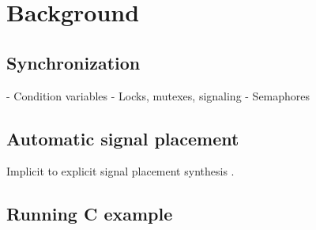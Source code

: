 \section{Background}

\subsection{Synchronization}
- Condition variables
- Locks, mutexes, signaling
- Semaphores

\subsection{Automatic signal placement}
Implicit to explicit signal placement synthesis \citep{ferles2018}.

\subsection{Running C example}
